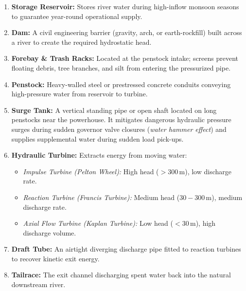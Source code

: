 \documentclass[11pt,a4paper]{article}
\begin{document}
\begin{enumerate}
  \item \textbf{Storage Reservoir:} Stores river water during high-inflow monsoon seasons to guarantee year-round operational supply.
  \item \textbf{Dam:} A civil engineering barrier (gravity, arch, or earth-rockfill) built across a river to create the required hydrostatic head.
  \item \textbf{Forebay \& Trash Racks:} Located at the penstock intake; screens prevent floating debris, tree branches, and silt from entering the pressurized pipe.
  \item \textbf{Penstock:} Heavy-walled steel or prestressed concrete conduits conveying high-pressure water from reservoir to turbine.
  \item \textbf{Surge Tank:} A vertical standing pipe or open shaft located on long penstocks near the powerhouse. It mitigates dangerous hydraulic pressure surges during sudden governor valve closures (\emph{water hammer effect}) and supplies supplemental water during sudden load pick-ups.
  \item \textbf{Hydraulic Turbine:} Extracts energy from moving water:
    \begin{itemize}
      \item \emph{Impulse Turbine (Pelton Wheel):} High head ($>300\,\text{m}$), low discharge rate.
      \item \emph{Reaction Turbine (Francis Turbine):} Medium head ($30-300\,\text{m}$), medium discharge rate.
      \item \emph{Axial Flow Turbine (Kaplan Turbine):} Low head ($<30\,\text{m}$), high discharge volume.
    \end{itemize}
  \item \textbf{Draft Tube:} An airtight diverging discharge pipe fitted to reaction turbines to recover kinetic exit energy.
  \item \textbf{Tailrace:} The exit channel discharging spent water back into the natural downstream river.
\end{enumerate}
\end{document}
